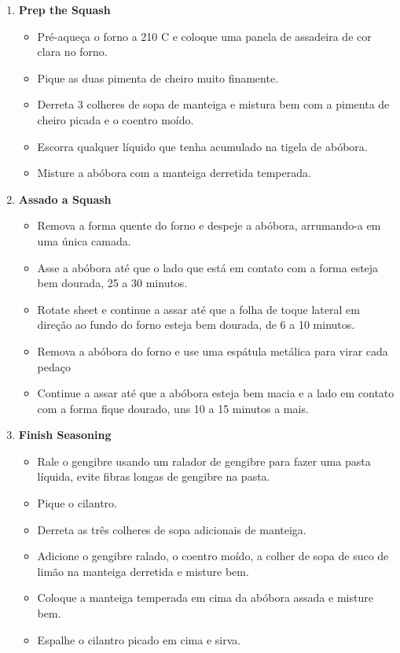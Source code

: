 \documentclass [11pt, letterpaper] {article}
\begin{document}
\begin {description}
\begin {enumerate}
\item {\bf Prep the Squash}
\begin {itemize}
\item Pré-aqueça o forno a 210 C e coloque uma panela de assadeira de cor clara no forno.
\item Pique as duas pimenta de cheiro muito finamente.
\item Derreta 3 colheres de sopa de manteiga e mistura bem com a pimenta de cheiro picada e o coentro moído.
\item Escorra qualquer líquido que tenha acumulado na tigela de abóbora.
\item Misture a abóbora com a manteiga derretida temperada.
\end {itemize}

\item {\bf Assado a Squash}
\begin {itemize}
\item Remova a forma quente do forno e despeje a abóbora, arrumando-a em uma única camada.
\item Asse a abóbora até que o lado que est\'a em contato com a forma esteja bem dourada, 25 a 30 minutos.
\item Rotate sheet e continue a assar até que a folha de toque lateral em direção ao fundo do forno esteja bem dourada, de 6 a 10 minutos.
\item Remova a abóbora do forno e use uma espátula metálica para virar cada peda\c{c}o
\item Continue a assar até que a abóbora esteja bem macia e a lado em contato com a forma fique dourado, uns 10 a 15 minutos a mais.
\end {itemize}

\item {\bf Finish Seasoning}
\begin {itemize}
\item Rale o gengibre usando um ralador de gengibre para fazer uma pasta líquida, evite fibras longas de gengibre na pasta.
\item Pique o cilantro.
\item Derreta as três colheres de sopa adicionais de manteiga.
\item Adicione o gengibre ralado, o coentro moído, a colher de sopa de suco de limão na manteiga derretida e misture bem.
\item Coloque a manteiga temperada em cima da abóbora assada e misture bem.
\item Espalhe o cilantro picado em cima e sirva.
\end {itemize}
\end {enumerate}
\end {description}
\end{document}

